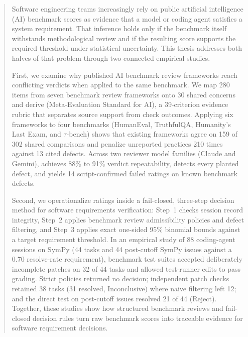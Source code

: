 \begin{abstract}
\addchaptertocentry{\abstractname}

Software engineering teams increasingly rely on public artificial intelligence (AI) benchmark scores as evidence that a model or coding agent satisfies a system requirement. That inference holds only if the benchmark itself withstands methodological review and if the resulting score supports the required threshold under statistical uncertainty. This thesis addresses both halves of that problem through two connected empirical studies.

First, we examine why published AI benchmark review frameworks reach conflicting verdicts when applied to the same benchmark. We map 280 items from seven benchmark review frameworks onto 30 shared concerns and derive \mesa{} (Meta-Evaluation Standard for AI), a 39-criterion evidence rubric that separates source support from check outcomes. Applying six frameworks to four benchmarks (HumanEval, TruthfulQA, Humanity's Last Exam, and $\tau$-bench) shows that existing frameworks agree on 159 of 302 shared comparisons and penalize unreported practices 210 times against 13 cited defects. Across two reviewer model families (Claude and Gemini), \mesa{} achieves 88\% to 91\% verdict repeatability, detects every planted defect, and yields 14 script-confirmed failed ratings on known benchmark defects.

Second, we operationalize \mesa{} ratings inside a fail-closed, three-step decision method for software requirements verification: Step~1 checks session record integrity, Step~2 applies benchmark review admissibility policies and defect filtering, and Step~3 applies exact one-sided 95\% binomial bounds against a target requirement threshold. In an empirical study of 88 coding-agent sessions on SymPy (44 \swebench{} tasks and 44 post-cutoff SymPy issues against a 0.70 resolve-rate requirement), benchmark test suites accepted deliberately incomplete patches on 32 of 44 tasks and allowed test-runner edits to pass grading. Strict policies returned no decision; independent patch checks retained 38 tasks (31 resolved, Inconclusive) where naive filtering left 12; and the direct test on post-cutoff issues resolved 21 of 44 (Reject). Together, these studies show how structured benchmark reviews and fail-closed decision rules turn raw benchmark scores into traceable evidence for software requirement decisions.

\end{abstract}

